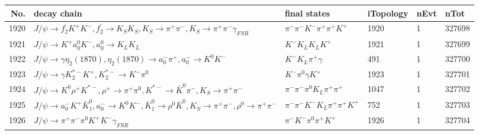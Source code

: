 \begin{table}[htbp] 
\begin{center}
\begin{small}
\begin{tabular}{rlllll}\hline\hline
 No. & decay chain & final states &  iTopology & nEvt & nTot \\\hline
1920&$J/\psi       \rightarrow f_2^{'}       K^{+}          K^{-}          , f_2^{'}        \rightarrow K_{S}          K_{S}          , K_{S}           \rightarrow \pi^{+}        \pi^{-}        , K_{S}           \rightarrow \pi^{+}        \pi^{-}        \gamma_{FSR} $&$\pi^{-}        \pi^{-}        K^{-}          \pi^{+}        \pi^{+}        K^{+}          $& 1920&    1&327698\\
1921&$J/\psi       \rightarrow K^{+}          a_{0}^{0}      K^{-}          , a_{0}^{0}       \rightarrow K_{L}          K_{L}          $&$K^{-}          K_{L}          K_{L}          K^{+}          $& 1921&    1&327699\\
1922&$J/\psi       \rightarrow \gamma       \eta_2(1870)  , \eta_2(1870)   \rightarrow a_{0}^{-}      \pi^{+}        , a_{0}^{-}       \rightarrow K^{0}          K^{-}          $&$K^{-}          K_{L}          \pi^{+}        \gamma       $&  491&    1&327700\\
1923&$J/\psi       \rightarrow \gamma       K_2^{*-}       K^{+}          , K_2^{*-}        \rightarrow K^{-}          \pi^{0}        $&$K^{-}          \pi^{0}        \gamma       K^{+}          $& 1923&    1&327701\\
1924&$J/\psi       \rightarrow K^{0}          \rho^{+}      K^{*-}         , \rho^{+}       \rightarrow \pi^{+}        \pi^{0}        , K^{*-}          \rightarrow \bar{K}^{0}   \pi^{-}        , K_{S}           \rightarrow \pi^{+}        \pi^{-}        $&$\pi^{-}        \pi^{-}        \pi^{0}        K_{L}          \pi^{+}        \pi^{+}        $& 1047&    1&327702\\
1925&$J/\psi       \rightarrow a_{0}^{-}      K^{+}          \bar{K}_1^{0} , a_{0}^{-}       \rightarrow K^{0}          K^{-}          , \bar{K}_1^{0}  \rightarrow \rho^{0}      \bar{K}^{0}   , K_{S}           \rightarrow \pi^{+}        \pi^{-}        , \rho^{0}       \rightarrow \pi^{+}        \pi^{-}        $&$\pi^{-}        \pi^{-}        K^{-}          K_{L}          \pi^{+}        \pi^{+}        K^{+}          $&  752&    1&327703\\
1926&$J/\psi       \rightarrow \pi^{+}        \pi^{-}        \pi^{0}        K^{+}          K^{-}          \gamma_{FSR} $&$\pi^{-}        K^{-}          \pi^{0}        \pi^{+}        K^{+}          $& 1926&    1&327704\\

\end{tabular}
\end{small}
\end{center}
\end{table}
